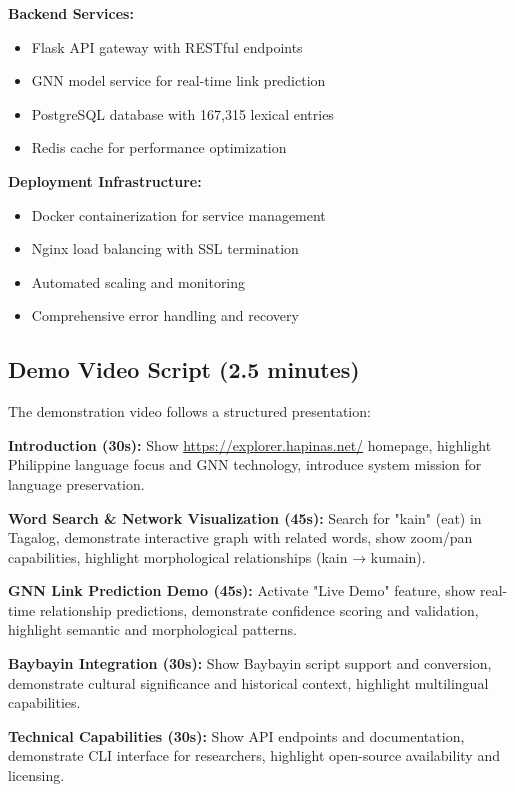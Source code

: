 \documentclass[11pt]{article}
\newcommand{\url}[1]{\href{#1}{#1}}
\begin{document}
\textbf{Backend Services:}
\begin{itemize}
    \item Flask API gateway with RESTful endpoints
    \item GNN model service for real-time link prediction
    \item PostgreSQL database with 167,315 lexical entries
    \item Redis cache for performance optimization
\end{itemize}

\textbf{Deployment Infrastructure:}
\begin{itemize}
    \item Docker containerization for service management
    \item Nginx load balancing with SSL termination
    \item Automated scaling and monitoring
    \item Comprehensive error handling and recovery
\end{itemize}

\subsection{Demo Video Script (2.5 minutes)}

The demonstration video follows a structured presentation:

\textbf{Introduction (30s):} Show \url{https://explorer.hapinas.net/} homepage, highlight Philippine language focus and GNN technology, introduce system mission for language preservation.

\textbf{Word Search \& Network Visualization (45s):} Search for "kain" (eat) in Tagalog, demonstrate interactive graph with related words, show zoom/pan capabilities, highlight morphological relationships (kain → kumain).

\textbf{GNN Link Prediction Demo (45s):} Activate "Live Demo" feature, show real-time relationship predictions, demonstrate confidence scoring and validation, highlight semantic and morphological patterns.

\textbf{Baybayin Integration (30s):} Show Baybayin script support and conversion, demonstrate cultural significance and historical context, highlight multilingual capabilities.

\textbf{Technical Capabilities (30s):} Show API endpoints and documentation, demonstrate CLI interface for researchers, highlight open-source availability and licensing.
\end{document}
